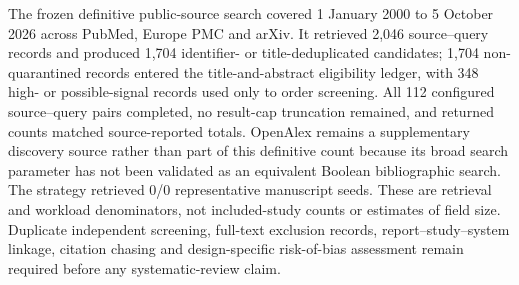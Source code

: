 The frozen definitive public-source search covered 1 January 2000 to 5 October 2026 across PubMed, Europe PMC and arXiv. It retrieved 2,046 source--query records and produced 1,704 identifier- or title-deduplicated candidates; 1,704 non-quarantined records entered the title-and-abstract eligibility ledger, with 348 high- or possible-signal records used only to order screening. All 112 configured source--query pairs completed, no result-cap truncation remained, and returned counts matched source-reported totals. OpenAlex remains a supplementary discovery source rather than part of this definitive count because its broad search parameter has not been validated as an equivalent Boolean bibliographic search. The strategy retrieved 0/0 representative manuscript seeds. These are retrieval and workload denominators, not included-study counts or estimates of field size. Duplicate independent screening, full-text exclusion records, report--study--system linkage, citation chasing and design-specific risk-of-bias assessment remain required before any systematic-review claim.
